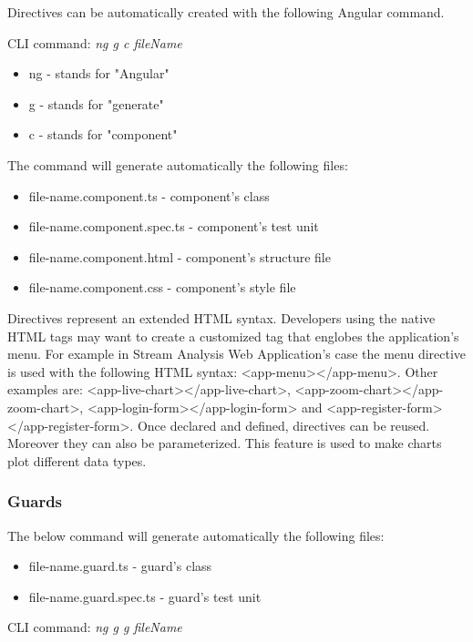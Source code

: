 Directives can be automatically created with the following Angular command.

CLI command: \textit{ng g c fileName}\\

\begin{itemize}
	\item ng - stands for "Angular"
	\item g - stands for "generate"
	\item c - stands for "component"
\end{itemize}

The command will generate automatically the following files:

\begin{itemize}
	\item file-name.component.ts - component's class
	\item file-name.component.spec.ts - component's test unit
	\item file-name.component.html - component's structure file
	\item file-name.component.css - component's style file
\end{itemize}


Directives represent an extended HTML syntax. Developers using the native HTML tags may want to create a customized tag that englobes the application's menu. For example in Stream Analysis Web Application's case the menu directive is used with the following HTML syntax: <app-menu></app-menu>. Other examples are: <app-live-chart></app-live-chart>, <app-zoom-chart></app-zoom-chart>, <app-login-form></app-login-form> and <app-register-form></app-register-form>. Once declared and defined, directives can be reused. Moreover they can also be parameterized. This feature is used to make charts plot different data types.

\subsubsection{Guards}
\label{chap:04:01:02:02}

The below command will generate automatically the following files:

\begin{itemize}
	\item file-name.guard.ts - guard's class
	\item file-name.guard.spec.ts - guard's test unit
\end{itemize}

CLI command: \textit{ng g g fileName}

